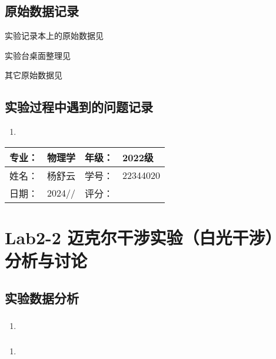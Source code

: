 \documentclass[dvipsnames, svgnames,a4paper,11pt]{article}
\begin{document}
	
	\clearpage
	\subsection{原始数据记录}
	实验记录本上的原始数据见%
	
	实验台桌面整理见%
	
	其它原始数据见%
	
	\subsection{实验过程中遇到的问题记录}
	\begin{enumerate}
		\item 
	\end{enumerate}
	
	
	
	\clearpage
	
	\begin{table}
		\renewcommand\arraystretch{1.7}
		\begin{tabularx}{\textwidth}{|X|X|X|X|}
			\hline
			专业：& 物理学 &年级：& 2022级\\
			\hline
			姓名： & 杨舒云 & 学号：& 22344020\\
			\hline
			日期：& 2024// & 评分： &\\
			\hline
		\end{tabularx}
	\end{table}
	
	\section{Lab2-2 迈克尔干涉实验（白光干涉） \quad\heiti 分析与讨论}
	
	\subsection{实验数据分析}
	
	\subsubsection{}
	\begin{enumerate}
		\item 
	\end{enumerate}
	
	\subsubsection{}
	\begin{enumerate}
		\item 
	\end{enumerate}
	
\end{document}
